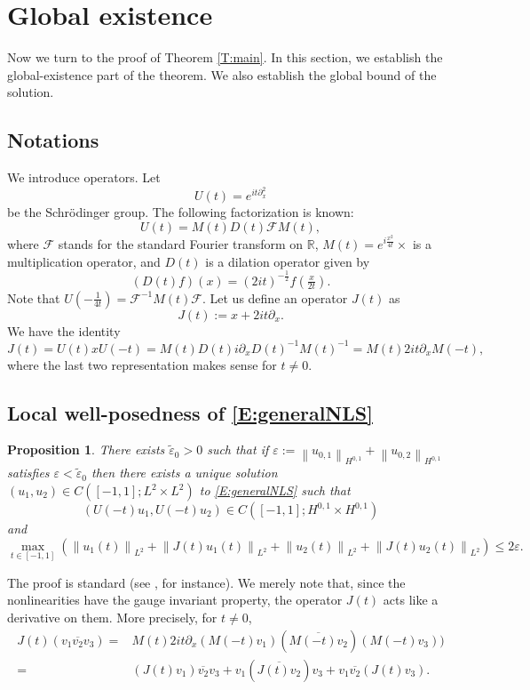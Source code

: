 \documentclass[11pt,a4paper,oneside]{amsart}
\theoremstyle{plain}
\newtheorem{proposition}[theorem]{Proposition}
\theoremstyle{remark}
\numberwithin{equation}{section}
\newcommand{\R}{\mathbb{R}}
\newcommand{\norm}[1]{\left\lVert #1\right\rVert}
\def\le{\leqslant}
\newcommand{\eps}{\varepsilon}
\theoremstyle{definition}
\begin{document}
\section{Global existence}\label{S:gb}


Now we turn to the proof of Theorem \ref{T:main}.
In this section, we establish the global-existence part of the theorem.
We also establish the global bound of the solution.


\subsection{Notations}
We introduce operators.
Let
\[
	U(t) = e^{it\partial_x^2}
\]
be the Schr\"odinger group.
The following factorization is known:
\[
	U(t) = M(t) D(t) \mathcal{F} M(t),
\]
where $\mathcal{F}$ stands for the standard Fourier transform on $\R$, $M(t) = e^{i \frac{x^2}{4t}} \times$ is a multiplication operator, 
and $D(t)$ is a dilation operator given by
\[
	(D(t)f)(x) = (2it)^{-\frac12} f(\tfrac{x}{2t}).
\]
Note that $U(-\frac1{4t}) = \mathcal{F}^{-1} M(t) \mathcal{F}$.
Let us define an operator $J(t)$ as
\[
	J(t) := x+ 2it \partial_x.
\]
We have the identity
\[
	J(t)=U(t)x U(-t)
	= M(t) D(t)i \partial_xD(t)^{-1} M(t)^{-1}= M(t) 2it \partial_x M(-t)
	,
\]
where the last two representation makes sense for $t\neq0$.

\subsection{Local well-posedness of \eqref{E:generalNLS}}
\begin{proposition}\label{P:LWP}
There exists $\widetilde{\eps}_0>0$ such that if $\eps:= \norm{u_{0,1}}_{H^{0,1}} + \norm{u_{0,2}}_{H^{0,1}}$ satisfies $\eps<\widetilde{\eps}_0$ then there exists a unique solution $(u_1,u_2) \in C([-1,1]; L^2 \times L^2)$ to \eqref{E:generalNLS} such that
$$(U(-t)u_1,U(-t)u_2) \in C([-1,1]; H^{0,1} \times H^{0,1})$$
and
\[
	\max_{t\in [-1,1]} (\norm{u_{1}(t)}_{L^2} + \norm{J(t)u_{1}(t)}_{L^2}+ \norm{u_{2}(t)}_{L^2}+\norm{J(t)u_{2}(t)}_{L^2}) \le 2\eps.
\]
\end{proposition}
The proof is standard (see \cite{CazBook}, for instance). 
We merely note that, since the nonlinearities have the gauge invariant property, the operator $J(t)$ acts like a derivative on them. More precisely, for $t\neq 0$,
\begin{align*}
	J(t) (v_1\overline{v_2}v_3)
	={}& M(t) 2it \partial_x (M(-t)
	v_1)(\overline{M(-t)v_2})(M(-t)v_3)) \\
	={}& (J(t) v_1)\overline{v_2}v_3 + v_1(\overline{J(t)v_2})v_3 + v_1\overline{v_2}(J(t)v_3).
\end{align*}
\end{document}
